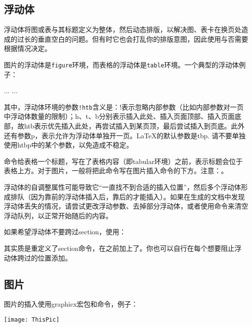 {\subsection{浮动体}
浮动体将图或表与其标题定义为整体，然后动态排版，以解决图、表卡在换页处造成的过长的垂直空白的问题。但有时它也会打乱你的排版意图，因此使用与否需要根据情况决定。

图片的浮动体是\texttt{figure}环境，而表格的浮动体是\texttt{table}环境。一个典型的浮动体例子：
\begin{latex}{}
\begin{table}[!htb]
  \begin{center}
    \caption{table-cap}
    \label{table-name}
    \begin{tabular}{...}
      ...
    \end{tabular}
  \end{center}
\end{table}
\end{latex}

其中，浮动体环境的参数\verb|!htb|含义是：!表示忽略内部参数（比如内部参数对一页中浮动体数量的限制）；h、t、b分别表示插入此处、插入页面顶部、插入页面底部，故htb表示优先插入此处，再尝试插入到某页顶，最后尝试插入到页底。此外还有参数p，表示允许为浮动体单独开一页。\LaTeX 的默认参数是tbp. 请不要单独使用htbp中的某个参数，以免造成不稳定。

\latexline{\\caption}命令给表格一个标题，写在了表格内容（即tabular环境）之前，表示标题会位于表格上方。对于图片，一般将把此命令写在图片插入命令的下方。注意：。\dpar

浮动体的自调整属性可能导致它“一直找不到合适的插入位置”，然后多个浮动体形成排队（因为靠前的浮动体插入后，靠后的才能插入）。如果在生成的文档中发现浮动体丢失的情况，请尝试更改浮动参数、去掉部分浮动体，或者使用\latexline{\\clearpage}命令来清空浮动队列，以正常开始随后的内容。

如果希望浮动体不要跨过section，使用：
\begin{latex}{}
\usepackage[section]{placeins}
\end{latex}

其实质是重定义了section命令，在之前加上了\latexline{\\FloatBarrier}。你也可以自行在每个想要阻止浮动体跨过的位置添加。

\subsection{图片}
图片的插入使用graphicx宏包和命令，例子：
\begin{latex}{}
\begin{center}
  \texttt{[image: ThisPic]}
\end{center}
\end{latex}

}
